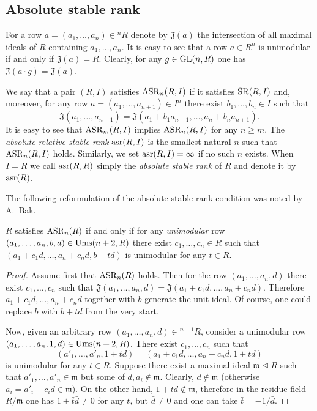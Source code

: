 \subsection{Absolute stable rank}
For a row $a=(a_1,\ldots,a_n)\in{}^n\!R$ denote by $\mathfrak{J}(a)$ the intersection of all maximal ideals of $R$ containing $a_1,\ldots,a_n$.
It is easy to see that a row $a\in R^n$ is unimodular if and only if $\mathfrak{J}(a)=R$. 
Clearly, for any $g\in\operatorname{GL}(n,R)$ one has $\mathfrak{J}(a\cdot g)=\mathfrak{J}(a)$.
\begin{dfn}
We say that a pair $(R,I)$ satisfies $\operatorname{ASR}_n(R,I)$ if it satisfies $\operatorname{SR}(R,I)$ and, moreover, for any row $a=(a_1,\ldots,a_{n+1})\in I^n$ there exist $b_1,\ldots,b_n\in I$ such that
\[\mathfrak{J}(a_1,\ldots,a_{n+1})=\mathfrak{J}(a_1+b_1a_{n+1},\ldots,a_n+b_na_{n+1}).\]
It is easy to see that $\operatorname{ASR}_m(R,I)$ implies $\operatorname{ASR}_n(R,I)$ for any $n\geqslant m$. The \emph{absolute relative stable rank} $\operatorname{asr}(R,I)$ is the smallest natural $n$ such that $\operatorname{ASR}_n(R, I)$ holds. Similarly, we set $\operatorname{asr}(R,I)=\infty$ if no such $n$ exists. When $I=R$ we call $\operatorname{asr}(R, R)$ simply the \emph{absolute stable rank} of $R$ and denote it by $\operatorname{asr}(R)$.
\end{dfn}
The following reformulation of the absolute stable rank condition was noted by A.~Bak.
\begin{lemma}
$R$ satisfies $\operatorname{ASR}_n(R)$ if and only if for any \emph{unimodular} row $(a_1,\ldots,a_n,b,d)\in\operatorname{Ums}(n+2,R)$ there exist $c_1,\ldots,c_n\in R$ such that $(a_1+c_1d,\ldots,a_n+c_nd,b+td)$ is unimodular for any $t\in R$.
\end{lemma}
\begin{proof}
Assume first that $\operatorname{ASR}_n(R)$ holds. Then for the row $(a_1,\ldots,a_n,d)$ there exist $c_1,\ldots,c_n$ such that $\mathfrak{J}(a_1,\ldots,a_n,d)=\mathfrak{J}(a_1+c_1d,\ldots,a_n+c_nd)$. Therefore $a_1+c_1d,\ldots,a_n+c_nd$ together with $b$ generate the unit ideal. Of course, one could replace $b$ with $b+td$ from the very start.

Now, given an arbitrary row $(a_1,\ldots,a_n,d)\in{}^{n+1}\!R$, consider a unimodular row $(a_1,\ldots,a_n,1,d)\in\operatorname{Ums}(n+2,R)$. There exist $c_1,\ldots,c_n$ such that
\[(a'_1,\ldots,a'_n,1+td)=(a_1+c_1d,\ldots,a_n+c_nd,1+td)\]
is unimodular for any $t\in R$. Suppose there exist a maximal ideal $\mathfrak{m}\trianglelefteq R$ such that $a'_1,\ldots,a'_n\in\mathfrak{m}$ but some of $d,a_i\notin\mathfrak{m}$. Clearly, $d\notin\mathfrak{m}$ (otherwise $a_i=a'_i-c_id\in\mathfrak{m}$). On the other hand, $1+td\notin\mathfrak{m}$, therefore in the residue field $R/\mathfrak{m}$ one has $1+\bar{t}\bar{d}\neq0$ for any $t$, but $\bar{d}\neq0$ and one can take $\bar{t}=-1/\bar{d}$.
\end{proof}
